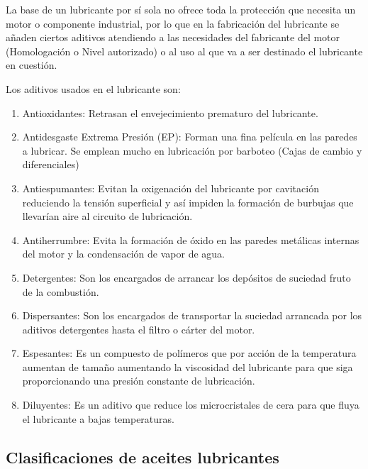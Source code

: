 La base de un lubricante por sí sola no ofrece toda la protección que necesita un motor o componente industrial, por lo que en la fabricación del lubricante se añaden ciertos aditivos atendiendo a las necesidades del fabricante del motor (Homologación o Nivel autorizado) o al uso al que va a ser destinado el lubricante en cuestión.

Los aditivos usados en el lubricante son:
\begin{enumerate}
    
\item Antioxidantes: Retrasan el envejecimiento prematuro del lubricante.

\item Antidesgaste Extrema Presión (EP): Forman una fina película en las paredes a lubricar. Se emplean mucho en lubricación por barboteo (Cajas de cambio y diferenciales)

\item Antiespumantes: Evitan la oxigenación del lubricante por cavitación reduciendo la tensión superficial y así impiden la formación de burbujas que llevarían aire al circuito de lubricación.

\item Antiherrumbre: Evita la formación de óxido en las paredes metálicas internas del motor y la condensación de vapor de agua.

\item Detergentes: Son los encargados de arrancar los depósitos de suciedad fruto de la combustión.

\item Dispersantes: Son los encargados de transportar la suciedad arrancada por los aditivos detergentes hasta el filtro o cárter del motor.

\item Espesantes: Es un compuesto de polímeros que por acción de la temperatura aumentan de tamaño aumentando la viscosidad del lubricante para que siga proporcionando una presión constante de lubricación.

\item Diluyentes: Es un aditivo que reduce los microcristales de cera para que fluya el lubricante a bajas temperaturas.
 
\end{enumerate}

\subsection{Clasificaciones de aceites lubricantes}

